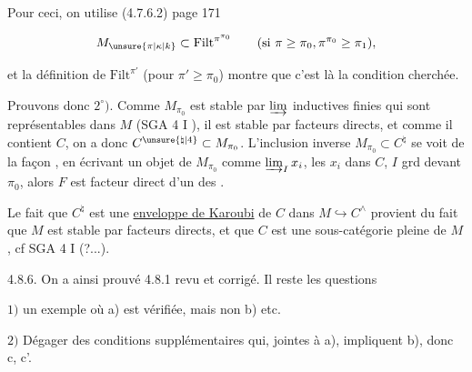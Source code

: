 Pour ceci, on utilise (4.7.6.2) page 171

\[ M_{\unsure{\pi|\kappa|k}}\subset\mathrm{Filt}^{\pi^{\pi_0}}\qquad(\text{si }\pi\geq\pi_0,\pi^{\pi_0}\geq\pi_1), \]

et la définition de $\mathrm{Filt}^{\pi'}$ (pour $\pi'\geq\pi_0$)  montre que c'est là la condition cherchée.

Prouvons donc $2^\circ)$. Comme $M_{\pi_0}$ est stable par  $\varinjlim$ inductives finies qui sont représentables dans $M$ (SGA 4 I ), il est stable par facteurs directs, et comme il contient $C$, on a donc $C^{\unsure{\natural|4}}\subset M_{\pi_0}$.  L'inclusion inverse $M_{\pi_0}\subset C^{\natural}$ se voit de la façon , en écrivant un objet  de $M_{\pi_0}$ comme $\varinjlim_I x_i$, les $x_i$ dans $C$, $I$ grd devant $\pi_0$, alors $F$  est facteur direct d'un des .

Le fait que $C^{\natural}$ est une \uline{enveloppe de Karoubi} de $C$ dans $M\hookrightarrow C^{\wedge}$ provient du fait que $M$ est stable par facteurs directs, et que $C$ est une sous-catégorie pleine de $M$, cf SGA 4 I (?...).

4.8.6.  On a ainsi prouvé 4.8.1 revu et corrigé. Il reste les questions 

$1)$  un exemple où  a) est  vérifiée, mais non b) etc.


$2)$ Dégager des conditions supplémentaires  qui, jointes à a), impliquent b), donc c, c'.
